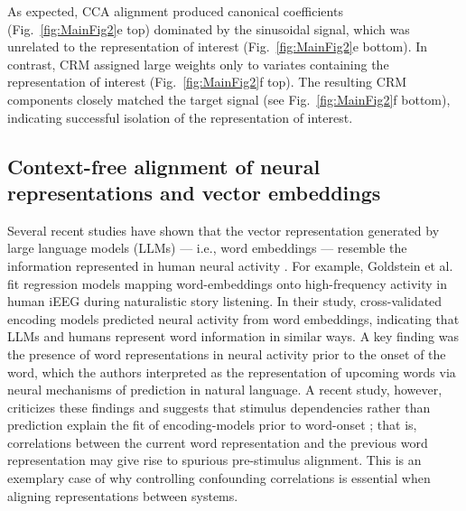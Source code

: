 \documentclass{article}
\begin{document}
\newpage%
As expected, CCA alignment produced canonical coefficients  (Fig.~\ref{fig:MainFig2}e top) dominated by the sinusoidal signal, which was unrelated to the representation of interest (Fig.~\ref{fig:MainFig2}e bottom). In contrast, CRM assigned large weights only to variates containing the representation of interest (Fig.~\ref{fig:MainFig2}f top). The resulting CRM components closely matched the target signal (see Fig.~\ref{fig:MainFig2}f bottom), indicating successful isolation of the representation of interest.
%
%
%
\subsection*{Context-free alignment of neural representations and vector embeddings\label{sec:iEEGalignment}}
Several recent studies have shown that the vector representation generated by large language models (LLMs) — i.e., word embeddings — resemble the information represented in human neural activity \cite{goldsteinAlignmentBrainEmbeddings2024, goldsteinSharedComputationalPrinciples2022, zadaSharedModelbasedLinguistic2024a}. For example, Goldstein et al. \cite{goldsteinSharedComputationalPrinciples2022} fit regression models mapping word-embeddings onto high-frequency activity in human iEEG during naturalistic story listening. In their study, cross-validated encoding models predicted neural activity from word embeddings, indicating that LLMs and humans represent word information in similar ways. A key finding was the presence of word representations in neural activity prior to the onset of the word, which the authors interpreted as the representation of upcoming words via neural mechanisms of prediction in natural language. A recent study, however, criticizes these findings and suggests that stimulus dependencies rather than prediction explain the fit of encoding-models prior to word-onset \cite{schonmannStimulusDependenciesRather2025}; that is, correlations between the current word representation and the previous word representation may give rise to spurious pre-stimulus alignment. This is an exemplary case of why controlling confounding correlations is essential when aligning representations between systems.
\end{document}
